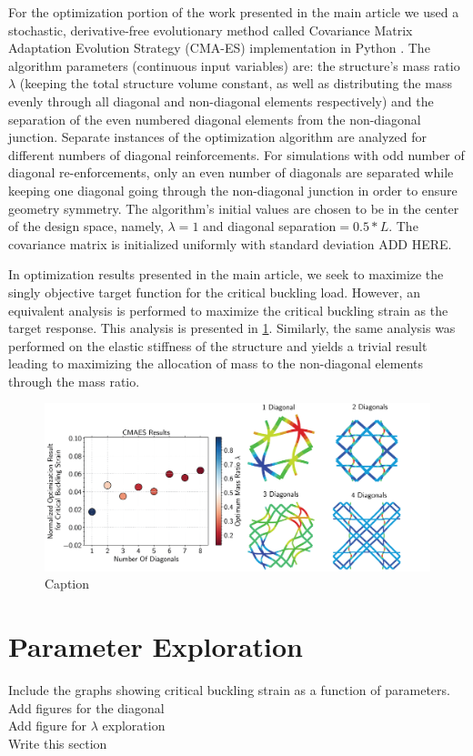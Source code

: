 \documentclass[10pt,twoside]{fernandes_supp}
\newcommand{\mf}[1]{\colorbox{blue!10}{\color{color3}#1}}
\begin{document}
For the optimization portion of the work presented in the main article we used a stochastic, derivative-free evolutionary method called Covariance Matrix Adaptation Evolution Strategy (CMA-ES) implementation in Python \citep{hansen2003}. The algorithm parameters (continuous input variables) are: the structure's mass ratio $\lambda$ (keeping the total structure volume constant, as well as distributing the mass evenly through all diagonal and non-diagonal elements respectively) and the separation of the even numbered diagonal elements from the non-diagonal junction. Separate instances of the optimization algorithm are analyzed for different numbers of diagonal reinforcements. For simulations with odd number of diagonal re-enforcements, only an even number of diagonals are separated while keeping one diagonal going through the non-diagonal junction in order to ensure geometry symmetry. The algorithm's initial values are chosen to be in the center of the design space, namely, $\lambda=1$ and diagonal separation$=0.5*L$. The covariance matrix is initialized uniformly with standard deviation \mf{ADD HERE}.

In optimization results presented in the main article, we seek to maximize the singly objective target function for the critical buckling load. However, an equivalent analysis is performed to maximize the critical buckling strain as the target response. This analysis is presented in \cref{BucklingOptimization}. Similarly, the same analysis was performed on the elastic stiffness of the structure and yields a trivial result leading to maximizing the allocation of mass to the non-diagonal elements through the mass ratio.

\begin{figure}[H]
    \centering
    \includegraphics[width=0.9\linewidth]{SFig6.png}
    \caption{Caption}
    \label{BucklingOptimization}
\end{figure}

\section{Parameter Exploration}
Include the graphs showing critical buckling strain as a function of parameters.\\
\mf{Add figures for the diagonal}\\
\mf{Add figure for $\lambda$ exploration}\\
\mf{Write this section}
\end{document}

